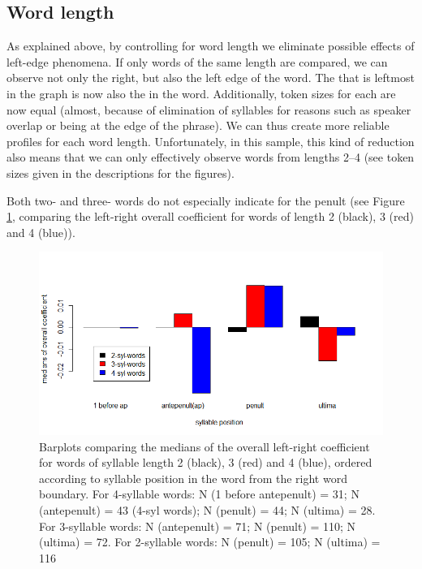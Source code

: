 \documentclass[output=paper]{LSP/langsci}
\begin{document}
\subsection{Word length} 
As explained above, by controlling for word length we eliminate possible effects of left-edge phenomena. If only words of the same length are compared, we can observe not only the right, but also the left edge of the word. The  that is leftmost in the graph is now also the  in the word. Additionally, token sizes for each  are now equal (almost, because of elimination of syllables for reasons such as speaker overlap or being at the edge of the phrase). We can thus create more reliable  profiles for each word length. Unfortunately, in this sample, this kind of reduction also means that we can only effectively observe words from lengths 2--4 (see token sizes given in the descriptions for the figures). 

\begin{samepage}

Both two- and three- words do not especially indicate  for the penult (see Figure \ref{fig:buc:3}, comparing the left-right overall coefficient for words of length 2 (black), 3 (red) and 4 (blue)).  

\end{samepage}

\begin{figure}
\includegraphics[width=\textwidth]{figures/BUC-img3_new.png}
 \caption{Barplots comparing the medians of the overall left-right coefficient for words of syllable length 2 (black), 3 (red) and 4 (blue), ordered according to syllable position in the word from the right word boundary. For 4-syllable words: N (1 before antepenult) = 31; N (antepenult) =  43 (4-syl words); N (penult) = 44; N (ultima) = 28. For 3-syllable words: N (antepenult) = 71; N (penult) = 110; N (ultima) = 72. For 2-syllable words: N (penult) = 105; N (ultima) = 116}
\label{fig:buc:3}
\end{figure}
\end{document}
